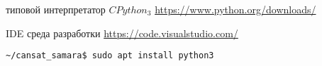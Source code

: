 \label{pyinst}

\begin{description}
    \item{типовой интерпретатор $CPython_3$} \url{https://www.python.org/downloads/}
    \item{IDE среда разработки} \url{https://code.visualstudio.com/}
\end{description}

\begin{verbatim}
~/cansat_samara$ sudo apt install python3
\end{verbatim}
